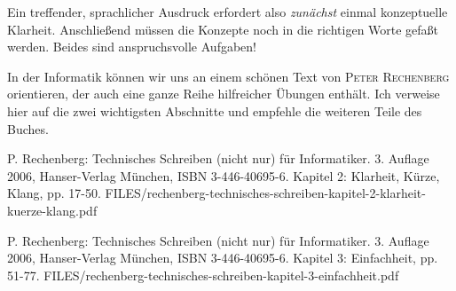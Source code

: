 Ein treffender, sprachlicher Ausdruck erfordert also \textit{zunächst} einmal konzeptuelle Klarheit.
Anschließend müssen die Konzepte noch in die richtigen Worte gefaßt werden.
Beides sind anspruchsvolle Aufgaben!

In der Informatik können wir uns an einem schönen Text von \textsc{Peter Rechenberg}
orientieren, der auch eine ganze Reihe hilfreicher Übungen enthält. Ich verweise hier auf die
zwei wichtigsten Abschnitte und empfehle die weiteren Teile des Buches.

{P. Rechenberg: Technisches Schreiben (nicht nur) für Informatiker.
3. Auflage 2006, Hanser-Verlag München, ISBN 3-446-40695-6.
Kapitel 2: Klarheit, Kürze, Klang, pp. 17-50.}
{FILES/rechenberg-technisches-schreiben-kapitel-2-klarheit-kuerze-klang.pdf}
{}

{P. Rechenberg: Technisches Schreiben (nicht nur) für Informatiker.
3. Auflage 2006, Hanser-Verlag München, ISBN 3-446-40695-6.
Kapitel 3: Einfachheit, pp. 51-77.}
{FILES/rechenberg-technisches-schreiben-kapitel-3-einfachheit.pdf}
{}


